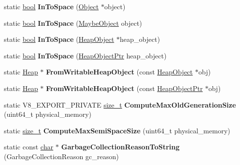 \begin{DoxyCompactItemize}
static \mbox{\hyperlink{classbool}{bool}} {\bfseries In\+To\+Space} (\mbox{\hyperlink{classv8_1_1internal_1_1Object}{Object}} $\ast$object)
\item 
\mbox{\label{classv8_1_1internal_1_1Heap_ac57da0a167c2b174ae258bcdb68ac121}} 
static \mbox{\hyperlink{classbool}{bool}} {\bfseries In\+To\+Space} (\mbox{\hyperlink{classv8_1_1internal_1_1MaybeObject}{Maybe\+Object}} object)
\item 
\mbox{\label{classv8_1_1internal_1_1Heap_a30078835be41b6c05133b84807ed59f3}} 
static \mbox{\hyperlink{classbool}{bool}} {\bfseries In\+To\+Space} (\mbox{\hyperlink{classv8_1_1internal_1_1HeapObject}{Heap\+Object}} $\ast$heap\+\_\+object)
\item 
\mbox{\label{classv8_1_1internal_1_1Heap_a04bd71df80b1bcb661bd05be8f7a14fd}} 
static \mbox{\hyperlink{classbool}{bool}} {\bfseries In\+To\+Space} (\mbox{\hyperlink{classv8_1_1internal_1_1HeapObjectPtr}{Heap\+Object\+Ptr}} heap\+\_\+object)
\item 
\mbox{\label{classv8_1_1internal_1_1Heap_a27f04c7817c66d7f2b3d134c64087467}} 
static \mbox{\hyperlink{classv8_1_1internal_1_1Heap}{Heap}} $\ast$ {\bfseries From\+Writable\+Heap\+Object} (const \mbox{\hyperlink{classv8_1_1internal_1_1HeapObject}{Heap\+Object}} $\ast$obj)
\item 
\mbox{\label{classv8_1_1internal_1_1Heap_abe46846cf2391816bd9361ce4081bcdc}} 
static \mbox{\hyperlink{classv8_1_1internal_1_1Heap}{Heap}} $\ast$ {\bfseries From\+Writable\+Heap\+Object} (const \mbox{\hyperlink{classv8_1_1internal_1_1HeapObjectPtr}{Heap\+Object\+Ptr}} $\ast$obj)
\item 
\mbox{\label{classv8_1_1internal_1_1Heap_a05264a8a4a8490e7a727ccbdbf0b9359}} 
static V8\+\_\+\+E\+X\+P\+O\+R\+T\+\_\+\+P\+R\+I\+V\+A\+TE \mbox{\hyperlink{classsize__t}{size\+\_\+t}} {\bfseries Compute\+Max\+Old\+Generation\+Size} (uint64\+\_\+t physical\+\_\+memory)
\item 
\mbox{\label{classv8_1_1internal_1_1Heap_a32edde45539abd52f1385f08cd1f0e9e}} 
static \mbox{\hyperlink{classsize__t}{size\+\_\+t}} {\bfseries Compute\+Max\+Semi\+Space\+Size} (uint64\+\_\+t physical\+\_\+memory)
\item 
\mbox{\label{classv8_1_1internal_1_1Heap_a212424de79309b7b1966caf562038613}} 
static const \mbox{\hyperlink{classchar}{char}} $\ast$ {\bfseries Garbage\+Collection\+Reason\+To\+String} (Garbage\+Collection\+Reason gc\+\_\+reason)
\end{DoxyCompactItemize}
